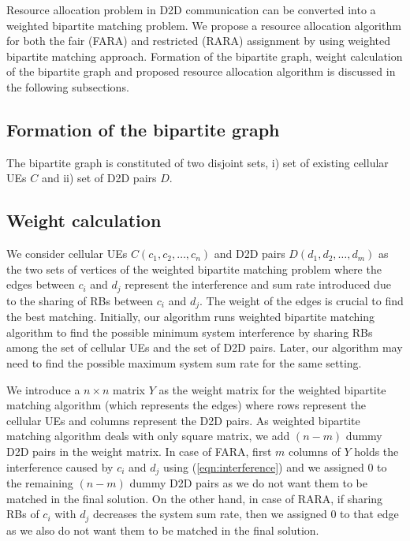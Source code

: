 \documentclass{ieeeaccess}
\begin{document}
Resource allocation problem in D2D communication can be converted into a weighted bipartite matching problem. We propose a resource allocation algorithm for both the fair (FARA) and restricted (RARA) assignment by using weighted bipartite matching approach. Formation of the bipartite graph, weight calculation of the bipartite graph and proposed resource allocation algorithm is discussed in the following subsections.

\subsection{Formation of the bipartite graph} \label{subsection:Formation of Bipartite Graph}
\smallskip
 
The bipartite graph is constituted of two disjoint sets, i) set of existing cellular UEs $C$ and ii) set of D2D pairs $D$. 

\subsection{Weight calculation} \label{subsection:Weight Calculation}
\smallskip
 
We consider cellular UEs $C(c_1,c_2,\ldots, c_n)$ and D2D pairs $D(d_1,d_2,\ldots,d_m)$ as the two sets of vertices of the weighted bipartite matching problem where the edges between $c_i$ and $d_j$ represent the interference and sum rate introduced due to the sharing of RBs between $c_i$ and $d_j$. The weight of the edges is crucial to find the best matching. Initially, our algorithm runs weighted bipartite matching algorithm \cite{hungarian} to find the possible minimum system interference by sharing RBs among the set of cellular UEs  and the set of D2D pairs. Later, our algorithm may need to find the possible maximum system sum rate for the same setting.

\smallskip
 
We introduce a $n \times n$ matrix $Y$ as the weight matrix for the weighted bipartite matching algorithm (which represents the edges) where rows represent the cellular UEs and columns represent the D2D pairs. As weighted bipartite matching algorithm deals with only square matrix, we add $(n-m)$ dummy D2D pairs in the weight matrix. In case of FARA, first $m$ columns of $Y$ holds the interference caused by $c_i$ and $d_j$ using (\ref{eqn:interference}) and we assigned $0$ to the remaining $(n-m)$ dummy D2D pairs as we do not want them to be matched in the final solution. On the other hand, in case of RARA, if sharing RBs of $c_i$ with $d_j$ decreases the system sum rate, then  we assigned $0$ to that edge as we also do not want them to be matched in the final solution. 
 
\end{document}
